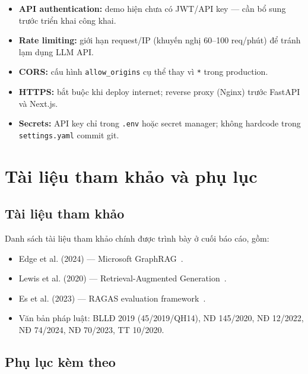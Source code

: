 \documentclass[../DoAn.tex]{subfiles}
\begin{document}
\begin{itemize}[nosep, leftmargin=*]
    \item \textbf{API authentication:} demo hiện chưa có JWT/API key --- cần bổ sung trước triển khai công khai.
    \item \textbf{Rate limiting:} giới hạn request/IP (khuyến nghị 60--100 req/phút) để tránh lạm dụng LLM API.
    \item \textbf{CORS:} cấu hình \texttt{allow\_origins} cụ thể thay vì \texttt{*} trong production.
    \item \textbf{HTTPS:} bắt buộc khi deploy internet; reverse proxy (Nginx) trước FastAPI và Next.js.
    \item \textbf{Secrets:} API key chỉ trong \texttt{.env} hoặc secret manager; không hardcode trong \texttt{settings.yaml} commit git.
\end{itemize}

\section{Tài liệu tham khảo và phụ lục}
\label{section:7.5}

\subsection{Tài liệu tham khảo}
\label{subsection:7.5.1}

Danh sách tài liệu tham khảo chính được trình bày ở cuối báo cáo, gồm:
\begin{itemize}[nosep, leftmargin=*]
    \item Edge et al. (2024) --- Microsoft GraphRAG~\cite{graphrag2024}.
    \item Lewis et al. (2020) --- Retrieval-Augmented Generation~\cite{lewis2020rag}.
    \item Es et al. (2023) --- RAGAS evaluation framework~\cite{es2023ragas}.
    \item Văn bản pháp luật: BLLĐ 2019 (45/2019/QH14), NĐ 145/2020, NĐ 12/2022, NĐ 74/2024, NĐ 70/2023, TT 10/2020.
\end{itemize}

\subsection{Phụ lục kèm theo}
\label{subsection:7.5.2}
\end{document}
